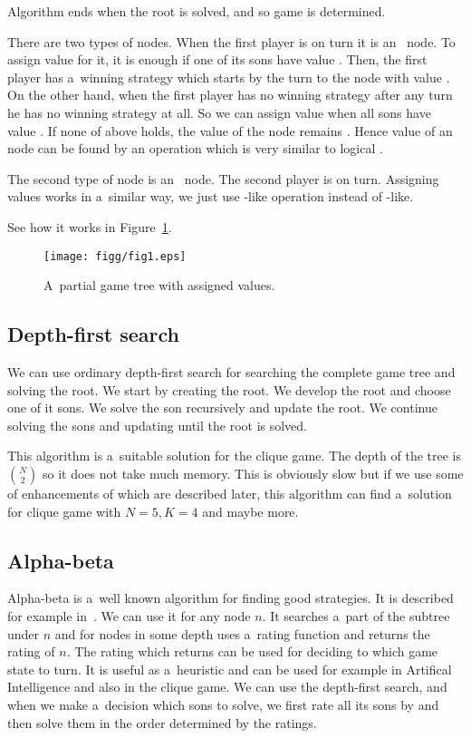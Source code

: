 Algorithm ends when the root is solved, and so game is determined.

There are two types of nodes. When the first player is on turn it is an~
node. To assign value  for it, it is enough if one of its sons
have value . Then, the first player has a~winning strategy which starts by the
turn to the node with value . On the other hand, when the first player has
no winning strategy after any turn he has no winning strategy at all. So we can
assign value  when all sons have value . If none of above holds,
the value of the node remains . Hence value of an~ node can be found by
an operation which is very similar to logical .

The second type of node is an~ node. The second player is on turn. Assigning values
works in a~similar way, we just use -like operation instead of -like.

See how it works in Figure~\ref{dva}.

\begin{figure}
	\centerline{\mbox{\texttt{[image: figg/fig1.eps]}}}
	\caption{A~partial game tree with assigned values.}
	\label{dva}
\end{figure}

\subsection{Depth-first search} We can use ordinary depth-first search for
searching the complete game tree and solving the root. We start by creating
the root. We develop the root and choose one of it sons. We solve the son
recursively and update the root. We continue solving the sons and updating
until the root is solved.

This algorithm is a~suitable solution for the clique game. The depth of the
tree is $N \choose 2$ so it does not take much memory. This is obviously slow
but if we use some of enhancements of  which are described later, this
algorithm can find a~solution for clique game with $N=5, K=4$ and maybe more.

\subsection{Alpha-beta}

Alpha-beta is a~well known algorithm for finding good strategies. It is described for
example in~\cite{alphabeta}.
We can use it for any node $n$. It searches a~part of the subtree under $n$ and for
nodes in some depth uses a~rating function and returns the rating of $n$. The rating
which  returns can be used for deciding to which game state to turn. It
is useful as a~heuristic and can be used for example in Artifical Intelligence
and also in the clique game.
We can use the depth-first search, and when we make a~decision which sons
to solve, we first rate all its sons by  and then solve them in the order
determined by the ratings.


